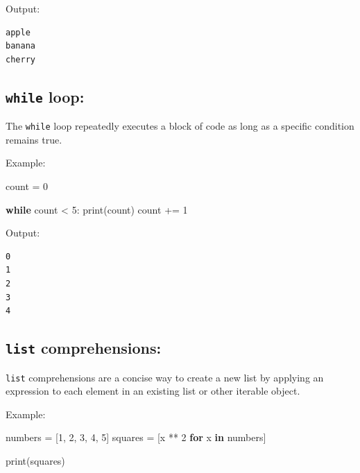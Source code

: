 \documentclass[
  paper=a4,
  ,captions=tableheading
]{scrartcl}
\newenvironment{Shaded}{}{}
\newcommand{\BuiltInTok}[1]{\textcolor[rgb]{0.00,0.50,0.00}{#1}}
\newcommand{\ControlFlowTok}[1]{\textcolor[rgb]{0.00,0.44,0.13}{\textbf{#1}}}
\newcommand{\DecValTok}[1]{\textcolor[rgb]{0.25,0.63,0.44}{#1}}
\newcommand{\KeywordTok}[1]{\textcolor[rgb]{0.00,0.44,0.13}{\textbf{#1}}}
\newcommand{\NormalTok}[1]{#1}
\newcommand{\OperatorTok}[1]{\textcolor[rgb]{0.40,0.40,0.40}{#1}}
\begin{document}
Output:

\begin{verbatim}
apple
banana
cherry
\end{verbatim}

\hypertarget{while-loop}{%
\subsection{\texorpdfstring{\texttt{while}
loop:}{while loop:}}\label{while-loop}}

The \texttt{while} loop repeatedly executes a block of code as long as a
specific condition remains true.

Example:

\begin{Shaded}
\begin{Highlighting}[]
\NormalTok{count }\OperatorTok{=} \DecValTok{0}

\ControlFlowTok{while}\NormalTok{ count }\OperatorTok{\textless{}} \DecValTok{5}\NormalTok{:}
    \BuiltInTok{print}\NormalTok{(count)}
\NormalTok{    count }\OperatorTok{+=} \DecValTok{1}
\end{Highlighting}
\end{Shaded}

Output:

\begin{verbatim}
0
1
2
3
4
\end{verbatim}

\hypertarget{list-comprehensions}{%
\subsection{\texorpdfstring{\texttt{list}
comprehensions:}{list comprehensions:}}\label{list-comprehensions}}

\texttt{list} comprehensions are a concise way to create a new list by
applying an expression to each element in an existing list or other
iterable object.

Example:

\begin{Shaded}
\begin{Highlighting}[]
\NormalTok{numbers }\OperatorTok{=}\NormalTok{ [}\DecValTok{1}\NormalTok{, }\DecValTok{2}\NormalTok{, }\DecValTok{3}\NormalTok{, }\DecValTok{4}\NormalTok{, }\DecValTok{5}\NormalTok{]}
\NormalTok{squares }\OperatorTok{=}\NormalTok{ [x }\OperatorTok{**} \DecValTok{2} \ControlFlowTok{for}\NormalTok{ x }\KeywordTok{in}\NormalTok{ numbers]}

\BuiltInTok{print}\NormalTok{(squares)}
\end{Highlighting}
\end{Shaded}
\end{document}
